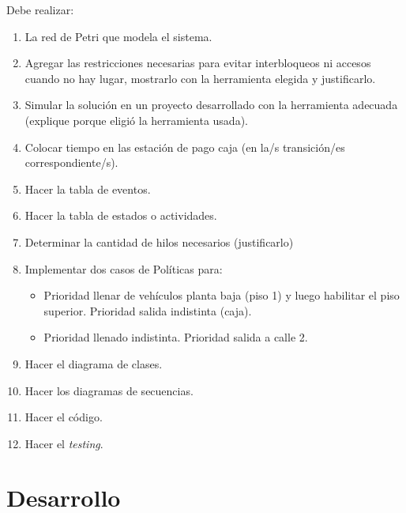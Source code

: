 \documentclass[12pt,a4paper]{article}
\begin{document}
Debe realizar:
\begin{enumerate}
\item La red de Petri que modela el sistema.
\item Agregar las restricciones necesarias para evitar interbloqueos ni accesos cuando no hay lugar, mostrarlo con la herramienta elegida y justificarlo.
\item Simular la solución en un proyecto desarrollado con la herramienta adecuada (explique porque eligió la herramienta usada).
\item Colocar tiempo en las estación de pago caja (en la/s transición/es correspondiente/s).
\item Hacer la tabla de eventos.
\item Hacer la tabla de estados o actividades.
\item Determinar la cantidad de hilos necesarios (justificarlo)
\item Implementar dos casos de Políticas para:

\begin{itemize}
\item Prioridad llenar de vehículos planta baja (piso 1) y luego habilitar el piso superior. Prioridad salida indistinta (caja).
\item Prioridad llenado indistinta. Prioridad salida a calle 2.
\end{itemize}

\item Hacer el diagrama de clases.
\item Hacer los diagramas de secuencias.
\item Hacer el código.
\item Hacer el \emph{testing}.
\end{enumerate}

\section{Desarrollo}
\label{desarrollo}
\end{document}
